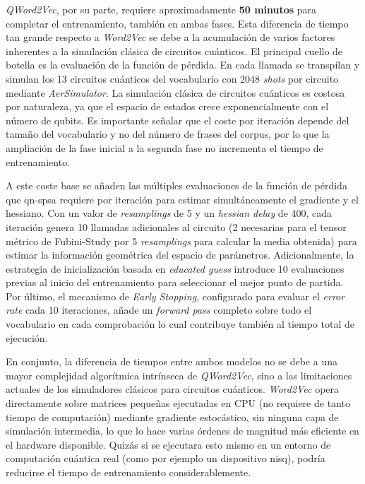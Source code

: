 \textit{QWord2Vec}, por su parte, requiere aproximadamente \textbf{50 minutos} para completar el entrenamiento, también en ambas fases. Esta diferencia de tiempo tan grande respecto a \textit{Word2Vec} se debe a la acumulación de varios factores inherentes a la simulación clásica de circuitos cuánticos. El principal cuello de botella es la evaluación de la función de pérdida. En cada llamada se transpilan y simulan los 13 circuitos cuánticos del vocabulario con 2048 \textit{shots} por circuito mediante \textit{AerSimulator}. La simulación clásica de circuitos cuánticos es costosa por naturaleza, ya que el espacio de estados crece exponencialmente con el número de qubits. Es importante señalar que el coste por iteración depende del tamaño del vocabulario y no del número de frases del corpus, por lo que la ampliación de la fase inicial a la segunda fase no incrementa el tiempo de entrenamiento.

A este coste base se añaden las múltiples evaluaciones de la función de pérdida que \gls{qn-spsa} requiere por iteración para estimar simultáneamente el gradiente y el hessiano. Con un valor de \textit{resamplings} de 5 y un \textit{hessian delay} de 400, cada iteración genera 10 llamadas adicionales al circuito (2 necesarias para el tensor métrico de Fubini-Study por 5 \textit{resamplings} para calcular la media obtenida) para estimar la información geométrica del espacio de parámetros. Adicionalmente, la estrategia de inicialización basada en \textit{educated guess} introduce 10 evaluaciones previas al inicio del entrenamiento para seleccionar el mejor punto de partida. Por último, el mecanismo de \textit{Early Stopping}, configurado para evaluar el \textit{error rate} cada 10 iteraciones, añade un \textit{forward pass} completo sobre todo el vocabulario en cada comprobación lo cual contribuye también al tiempo total de ejecución.

En conjunto, la diferencia de tiempos entre ambos modelos no se debe a una mayor complejidad algorítmica intrínseca de \textit{QWord2Vec}, sino a las limitaciones actuales de los simuladores clásicos para circuitos cuánticos. \textit{Word2Vec} opera directamente sobre matrices pequeñas ejecutadas en CPU (no requiere de tanto tiempo de computación) mediante gradiente estocástico, sin ninguna capa de simulación intermedia, lo que lo hace varias órdenes de magnitud más eficiente en el hardware disponible. Quizás si se ejecutara esto mismo en un entorno de computación cuántica real (como por ejemplo un dispositivo \gls{nisq}), podría reducirse el tiempo de entrenamiento considerablemente.
